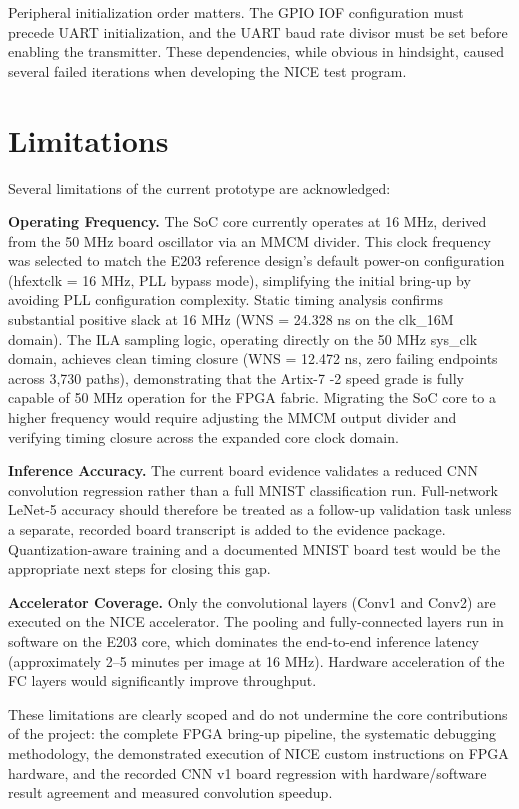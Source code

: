 Peripheral initialization order matters. The GPIO IOF configuration must precede UART initialization, and the UART baud rate divisor must be set before enabling the transmitter. These dependencies, while obvious in hindsight, caused several failed iterations when developing the NICE test program.


\section{Limitations}\label{sec:5_5}

Several limitations of the current prototype are acknowledged:

\textbf{Operating Frequency.} The SoC core currently operates at 16 MHz, derived from the 50 MHz board oscillator via an MMCM divider. This clock frequency was selected to match the E203 reference design's default power-on configuration (hfextclk = 16 MHz, PLL bypass mode), simplifying the initial bring-up by avoiding PLL configuration complexity. Static timing analysis confirms substantial positive slack at 16 MHz (WNS = 24.328 ns on the clk\_16M domain). The ILA sampling logic, operating directly on the 50 MHz sys\_clk domain, achieves clean timing closure (WNS = 12.472 ns, zero failing endpoints across 3,730 paths), demonstrating that the Artix-7 -2 speed grade is fully capable of 50 MHz operation for the FPGA fabric. Migrating the SoC core to a higher frequency would require adjusting the MMCM output divider and verifying timing closure across the expanded core clock domain.

\textbf{Inference Accuracy.} The current board evidence validates a reduced CNN convolution regression rather than a full MNIST classification run. Full-network LeNet-5 accuracy should therefore be treated as a follow-up validation task unless a separate, recorded board transcript is added to the evidence package. Quantization-aware training and a documented MNIST board test would be the appropriate next steps for closing this gap.

\textbf{Accelerator Coverage.} Only the convolutional layers (Conv1 and Conv2) are executed on the NICE accelerator. The pooling and fully-connected layers run in software on the E203 core, which dominates the end-to-end inference latency (approximately 2--5 minutes per image at 16 MHz). Hardware acceleration of the FC layers would significantly improve throughput.


These limitations are clearly scoped and do not undermine the core contributions of the project: the complete FPGA bring-up pipeline, the systematic debugging methodology, the demonstrated execution of NICE custom instructions on FPGA hardware, and the recorded CNN v1 board regression with hardware/software result agreement and measured convolution speedup.

